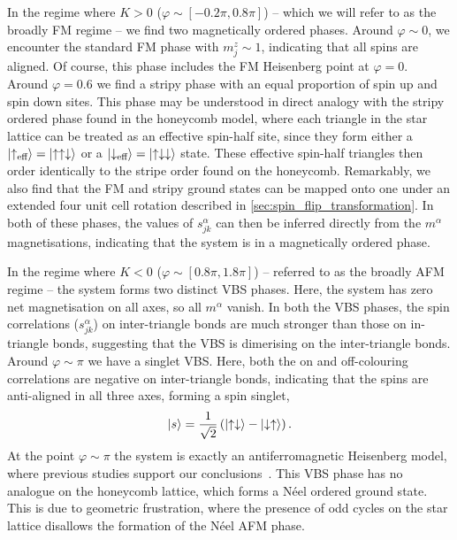 In the regime where $K>0$ ($\varphi \sim [-0.2\pi, 0.8\pi]$) -- which we will refer to as the broadly FM regime -- we find two magnetically ordered phases. 
Around $\varphi \sim 0$, we encounter the standard FM phase with $m_j^z \sim 1$, indicating that all spins are aligned. Of course, this phase includes the FM Heisenberg point at $\varphi = 0$. 
Around $\varphi = 0.6$ we find a stripy phase with an equal proportion of spin up and spin down sites. This phase may be understood in direct analogy with the stripy ordered phase found in the honeycomb model, where each triangle in the star lattice can be treated as an effective spin-half site, since they form either a $\ket{\uparrow_{\textup{eff}}} = \ket{\uparrow \uparrow \downarrow}$ or a $\ket{\downarrow_{\textup{eff}}} = \ket{\uparrow \downarrow \downarrow}$ state. These effective spin-half triangles then order identically to the stripe order found on the honeycomb. Remarkably, we also find that the FM and stripy ground states can be mapped onto  one under an extended four unit cell rotation described in \textsection\ref{sec:spin_flip_transformation}. In both of these phases, the values of $s_{jk}^\alpha$ can then be inferred directly from the $m^\alpha$ magnetisations, indicating that the system is in a magnetically ordered phase.

In the regime where $K<0$ ($\varphi \sim [0.8\pi, 1.8\pi]$) -- referred to as the broadly AFM regime -- the system forms two distinct VBS phases. Here, the system has zero net magnetisation on all axes, so all $m^\alpha$ vanish. In both the VBS phases, the spin correlations ($s_{jk}^\alpha$) on inter-triangle bonds are much stronger than those on in-triangle bonds, suggesting that the VBS is dimerising on the inter-triangle bonds.
Around $\varphi \sim \pi$ we have a singlet VBS. Here, both the on and off-colouring correlations are negative on inter-triangle bonds, indicating that the spins are anti-aligned in all three axes, forming a spin singlet,
\begin{align}
    \ket{s} = \frac{1}{\sqrt 2} \left ( \ket{\uparrow \downarrow}-\ket{ \downarrow \uparrow} \right ). \label{eqn:s_def}
\end{align}
At the point $\varphi \sim \pi$ the system is exactly an antiferromagnetic Heisenberg model, where previous studies support our conclusions~\cite{richter_absence_2004, yang_competing_2010, jahromi_infinite_2018}. This VBS phase has no analogue on the honeycomb lattice, which forms a N\'eel ordered ground state. This is due to geometric frustration, where the presence of odd cycles on the star lattice disallows the formation of the N\'eel AFM phase. 

